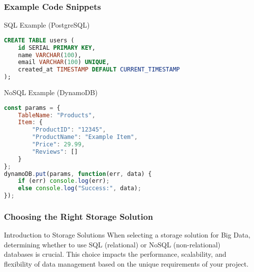 \documentclass[aspectratio=169]{beamer}
\begin{document}
\begin{frame}[fragile]
    \frametitle{Example Code Snippets}
    \begin{block}{SQL Example (PostgreSQL)}
        \begin{lstlisting}[language=sql]
CREATE TABLE users (
    id SERIAL PRIMARY KEY,
    name VARCHAR(100),
    email VARCHAR(100) UNIQUE,
    created_at TIMESTAMP DEFAULT CURRENT_TIMESTAMP
);
        \end{lstlisting}
    \end{block}

    \begin{block}{NoSQL Example (DynamoDB)}
        \begin{lstlisting}[language=JavaScript]
const params = {
    TableName: "Products",
    Item: {
        "ProductID": "12345",
        "ProductName": "Example Item",
        "Price": 29.99,
        "Reviews": []
    }
};
dynamoDB.put(params, function(err, data) {
    if (err) console.log(err);
    else console.log("Success:", data);
});
        \end{lstlisting}
    \end{block}
\end{frame}

\begin{frame}[fragile]
    \frametitle{Choosing the Right Storage Solution}
    \begin{block}{Introduction to Storage Solutions}
        When selecting a storage solution for Big Data, determining whether to use SQL (relational) or NoSQL (non-relational) databases is crucial. This choice impacts the performance, scalability, and flexibility of data management based on the unique requirements of your project.
    \end{block}
\end{frame}
\end{document}
